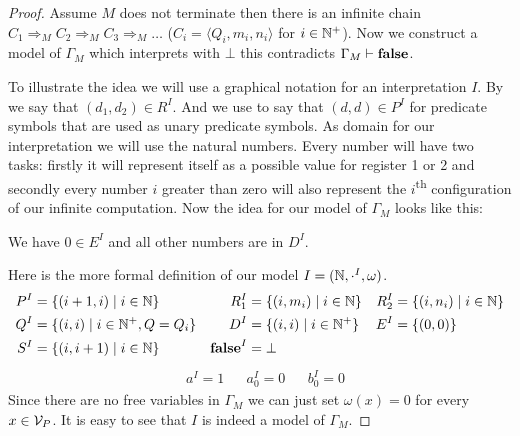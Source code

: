 \begin{proof}
	Assume $M$ does not terminate then there is an infinite chain $C_1\Rightarrow_M C_2\Rightarrow_M C_3\Rightarrow_M\dots$ ($C_i=\langle Q_i,m_i,n_i\rangle$ for $i\in\mathbb{N}^+$). Now we construct a model of $\Gamma_M$ which interprets \false{} with $\bot$ this contradicts $\Gamma_M\vdash\textbf{false}$.
	
	To illustrate the idea we will use a graphical notation for an interpretation $I$.
	By
	we say that $(d_1,d_2)\in R^I$. And we use
	to say that $(d,d)\in P^I$ for predicate symbols that are used as unary predicate symbols. 
	As domain for our interpretation we will use the natural numbers. Every number will have two tasks: firstly it will represent itself as a possible value for register 1 or 2 and secondly every number $i$ greater than zero will also represent the $i$\textsuperscript{th} configuration of our infinite computation.
	Now the idea for our model of $\Gamma_M$ looks like this:
	
	\begin{figure}[H]
		\centering
		
	\end{figure}
	We have $0\in E^I$ and all other numbers are in $D^I$.
	
	Here is the more formal definition of our model $I=(\mathbb{N},\cdot^I,\omega)$.
	\begin{align*}
		  P^I&=\{(i+1,i)\mid i\in\mathbb{N}\}              & R_1^I&=\{(i,m_i)\mid i\in\mathbb{N}\} & R_2^I&=\{(i,n_i)\mid i\in\mathbb{N}\} \\
		  Q^I&=\{(i,i)\mid i\in\mathbb{N}^+, Q=Q_i\} &  D^I&=\{(i,i)\mid i\in\mathbb{N}^+\}         & E^I&=\{(0,0)\}                            \\
		  S^I&=\{(i,i+1)\mid i\in\mathbb{N}\} & \textbf{false}^I&=\bot
	\end{align*}
	\begin{align*}
		  & a^I=1 &   & a_0^I=0 &   & b_0^I=0 
	\end{align*}
	Since there are no free variables in $\Gamma_M$ we can just set $\omega(x)=0$ for every $x\in\mathcal{V}_P$. It is easy to see that $I$ is indeed a model of $\Gamma_M$.
\end{proof}

